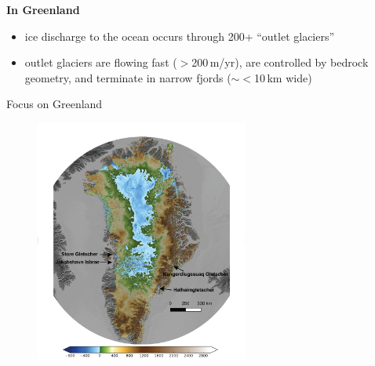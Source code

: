 \documentclass[hide notes,intlimits]{beamer}
\begin{document}
\begin{frame}[plain]
  \textbf{In Greenland}
    \begin{itemize}
    \item ice discharge to the ocean occurs through 200+ ``outlet glaciers''
    \item outlet glaciers are flowing fast ($>$200\,m/yr), are controlled by bedrock geometry, and terminate in narrow fjords ($\sim <$10\,km wide)
    \end{itemize}
\end{frame}
 
{
%
} 

\begin{frame}{Focus on Greenland}
      \begin{figure}
        \includegraphics[height=8cm]{gris-marine-4outlet}
      \end{figure}
\end{frame}


  {
}
\end{document}
